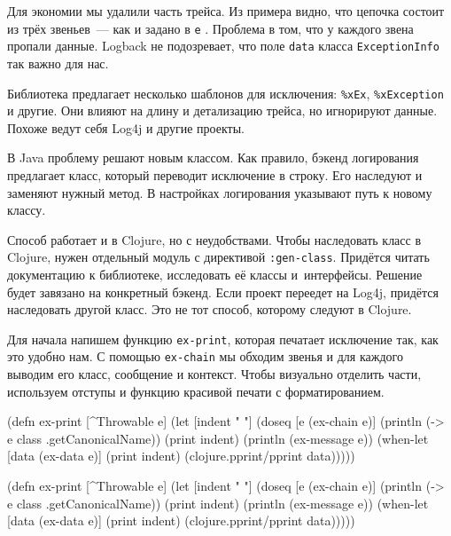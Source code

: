 \fi

Для экономии мы удалили часть трейса. Из примера видно, что цепочка состоит из
трёх звеньев~--- как и задано в \verb|e| . Проблема в том, что у
каждого звена пропали данные. Logback не подозревает, что поле \verb|data|
класса \texttt{ExceptionInfo} так важно для нас.


Библиотека предлагает несколько шаблонов для исключения: \verb|%xEx|,
\verb|%xException| и другие. Они влияют на длину и детализацию трейса, но
игнорируют данные. Похоже ведут себя Log4j и другие проекты.

В Java проблему решают новым классом. Как правило, бэкенд логирования предлагает
класс, который переводит исключение в строку. Его наследуют и заменяют нужный
метод. В настройках логирования указывают путь к новому классу.

Способ работает и в Clojure, но с неудобствами. Чтобы наследовать класс в
Clojure, нужен отдельный модуль с директивой \verb|:gen-class|. Придётся читать
документацию к библиотеке, исследовать её классы и~интерфейсы. Решение будет
завязано на конкретный бэкенд. Если проект переедет на Log4j, придётся
наследовать другой класс. Это не тот способ, которому следуют в Clojure.

Для начала напишем функцию \verb|ex-print|, которая печатает исключение так, как
это удобно нам. С помощью \verb|ex-chain| мы обходим звенья и для каждого
выводим его класс, сообщение и контекст. Чтобы визуально отделить части,
используем отступы и функцию красивой печати с форматированием.

\iflarge\vspace{15mm}\pagebreak[4]\fi


\ifnarrow

\begin{english}
  \begin{clojure}
(defn ex-print
  [^Throwable e]
  (let [indent "  "]
    (doseq [e (ex-chain e)]
      (println (-> e
                   class
                   .getCanonicalName))
      (print indent)
      (println (ex-message e))
      (when-let [data (ex-data e)]
        (print indent)
        (clojure.pprint/pprint data)))))
  \end{clojure}
\end{english}

\else

\begin{english}
  \begin{clojure}
(defn ex-print
  [^Throwable e]
  (let [indent "  "]
    (doseq [e (ex-chain e)]
      (println (-> e class .getCanonicalName))
      (print indent)
      (println (ex-message e))
      (when-let [data (ex-data e)]
        (print indent)
        (clojure.pprint/pprint data)))))
  \end{clojure}
\end{english}

